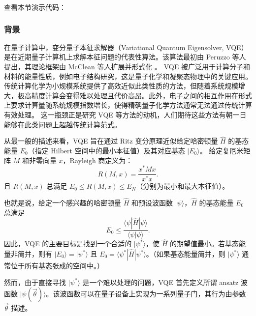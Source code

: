 
查看本节演示代码： \ 

\subsubsection{背景}

在量子计算中，变分量子本征求解器（Variational Quantum Eigensolver, VQE）是在近期量子计算机上求解本征问题的代表性算法。该算法最初由 Peruzzo 等人提出，其理论框架由 McClean 等人扩展并形式化 \cite{Peruzzo2014Peruzzo2014}。
VQE 被广泛用于计算分子和材料的能量性质，例如电子结构研究，这是量子化学和凝聚态物理中的关键应用。
传统计算化学为小规模系统提供了高效近似此类性质的方法，但随着系统规模增大，极高精度计算会变得难以处理且代价高昂。此外，电子之间的相互作用在形式上要求计算量随系统规模指数增长，使得精确量子化学方法通常无法通过传统计算有效处理。
这一瓶颈正是研究 VQE 等方法的动机，人们期待这些方法有朝一日能够在此类问题上超越传统计算范式。

从最一般的描述来看，VQE 旨在通过 Ritz 变分原理近似给定哈密顿量 $\hat{H}$ 的基态能量 $E_0$（指定 Hilbert 空间中的最小本征值）及其对应基态 $|E_0\rangle$。
给定复厄米矩阵 $M$ 和非零向量 $x$，Rayleigh 商定义为：
\begin{equation}
    R(M,x)=\frac{x^*Mx}{x^*x}.
\end{equation}
且 $R(M,x)$ 总满足 $E_0\leq R(M,x)\leq E_N$（分别为最小和最大本征值）。

也就是说，给定一个感兴趣的哈密顿量 $\hat{H}$ 和预设波函数 $|\psi\rangle$，$\hat{H}$ 的基态能量 $E_{0}$ 总满足
\begin{equation}
    E_0 \leq \frac{\langle \psi |\hat{H}| \psi \rangle}{\langle \psi |\psi\rangle}.
\end{equation}
因此，VQE 的主要目标是找到一个合适的 $|\psi^*\rangle$，使 $\hat{H}$ 的期望值最小。若基态能量非简并，则有 $|E_0\rangle = |\psi^*\rangle$ 且 $E_0 = \langle \psi^* |\hat{H}| \psi^* \rangle$。（如果基态能量简并，则 $|\psi^*\rangle$ 通常位于所有基态张成的空间中。）

然而，由于直接寻找 $|\psi^*\rangle$ 是一个难以处理的问题，VQE 首先定义所谓 ansatz 波函数 $|\psi(\vec{\theta})\rangle$。该波函数可以在量子设备上实现为一系列量子门，其行为由参数 $\vec{\theta}$ 描述。


